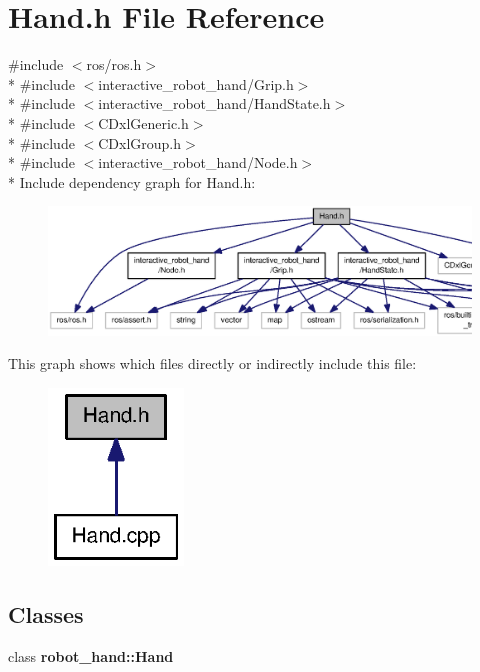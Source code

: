 \section{Hand.\-h File Reference}
\label{Hand_8h}
{\ttfamily \#include $<$ros/ros.\-h$>$}\\*
{\ttfamily \#include $<$interactive\-\_\-robot\-\_\-hand/\-Grip.\-h$>$}\\*
{\ttfamily \#include $<$interactive\-\_\-robot\-\_\-hand/\-Hand\-State.\-h$>$}\\*
{\ttfamily \#include $<$C\-Dxl\-Generic.\-h$>$}\\*
{\ttfamily \#include $<$C\-Dxl\-Group.\-h$>$}\\*
{\ttfamily \#include $<$interactive\-\_\-robot\-\_\-hand/\-Node.\-h$>$}\\*
Include dependency graph for Hand.\-h\-:
\nopagebreak
\begin{figure}[H]
\begin{center}
\leavevmode
\includegraphics[width=350pt]{Hand_8h__incl}
\end{center}
\end{figure}
This graph shows which files directly or indirectly include this file\-:
\nopagebreak
\begin{figure}[H]
\begin{center}
\leavevmode
\includegraphics[width=102pt]{Hand_8h__dep__incl}
\end{center}
\end{figure}
\subsection*{Classes}
\begin{DoxyCompactItemize}
\item 
class {\bf robot\-\_\-hand\-::\-Hand}
\end{DoxyCompactItemize}
